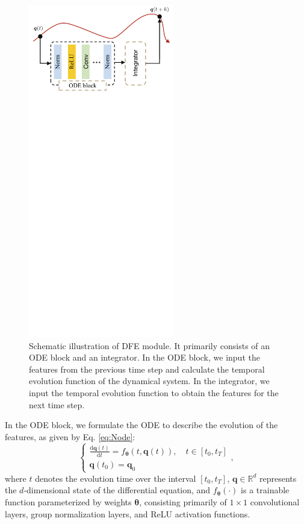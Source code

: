 \documentclass[12pt]{spieman}  %
\begin{document}
\begin{spacing}{2}
		\begin{figure}[!htbp]
			\centering
			\includegraphics[width=2.5in]{Figure_2}
			\caption{Schematic illustration of DFE module. It primarily consists of an ODE block and an integrator. In the ODE block, we input the features from the previous time step and calculate the temporal evolution function of the dynamical system. In the integrator, we input the temporal evolution function to obtain the features for the next time step.}
			\label{fig:ode_module}
		\end{figure}
		
		In the ODE block, we formulate the ODE to describe the evolution of the features, as given by Eq. \eqref{eq:Node}:
		\begin{equation}
			\label{eq:Node}
			\left.\left\{\begin{array}{l}\frac{\mathrm{d}\boldsymbol{q}(t)}{\mathrm{d}t}=f_{\boldsymbol{\theta}}(t,\boldsymbol{q}(t)),\quad t\in[t_{0},t_{T}]\\\boldsymbol{q}(t_0)=\boldsymbol{q}_{0}\end{array}\right.\right.,
		\end{equation}
		where $t$ denotes the evolution time over the interval $[t_0, t_T]$, $\boldsymbol{q} \in \mathbb{R}^{d}$ represents the $d$-dimensional state of the differential equation, and $f_{\boldsymbol{\theta}}(\cdot)$ is a trainable function parameterized by weights $\boldsymbol{\theta}$, consisting primarily of $1\times1$ convolutional layers, group normalization layers, and ReLU activation functions.
		

\end{spacing}
\end{document}
